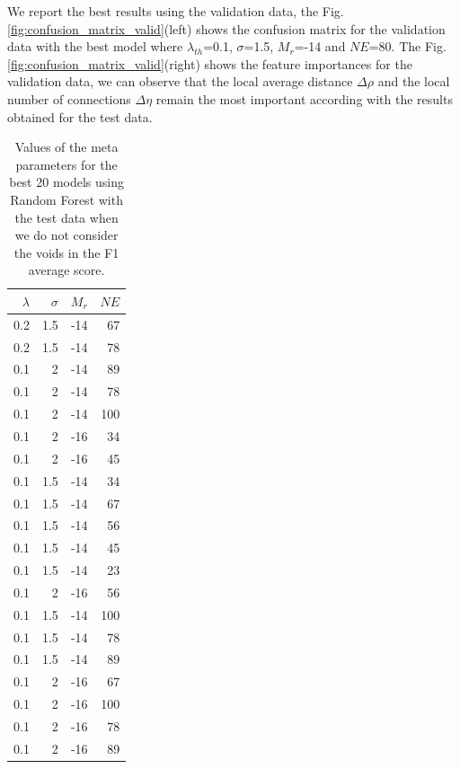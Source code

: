\documentclass[usenatbib]{mnras}
\begin{document}
We report the best results using the validation data, the
Fig. \ref{fig:confusion_matrix_valid}(left) shows the confusion matrix
for the validation data with the best model where $\lambda_{th}$=0.1,
$\sigma$=1.5, $M_r$=-14 and $NE$=80. The
Fig. \ref{fig:confusion_matrix_valid}(right) shows the feature
importances for the validation data, we can observe that the local
average distance $\Delta \rho$ and the local number of connections
$\Delta \eta$ remain the most important according with the results
obtained for the test data. 


\begin{table}
\centering
\begin{tabular}{rrrr}
\hline
   $\lambda$ &   $\sigma$ &   $M_r$ &   $NE$ \\
\hline
         0.2 &        1.5 &     -14 &     67 \\
         0.2 &        1.5 &     -14 &     78 \\
         0.1 &        2   &     -14 &     89 \\
         0.1 &        2   &     -14 &     78 \\
         0.1 &        2   &     -14 &    100 \\
         0.1 &        2   &     -16 &     34 \\
         0.1 &        2   &     -16 &     45 \\
         0.1 &        1.5 &     -14 &     34 \\
         0.1 &        1.5 &     -14 &     67 \\
         0.1 &        1.5 &     -14 &     56 \\
         0.1 &        1.5 &     -14 &     45 \\
         0.1 &        1.5 &     -14 &     23 \\
         0.1 &        2   &     -16 &     56 \\
         0.1 &        1.5 &     -14 &    100 \\
         0.1 &        1.5 &     -14 &     78 \\
         0.1 &        1.5 &     -14 &     89 \\
         0.1 &        2   &     -16 &     67 \\
         0.1 &        2   &     -16 &    100 \\
         0.1 &        2   &     -16 &     78 \\
         0.1 &        2   &     -16 &     89 \\
\hline
\end{tabular}
\caption{Values of the meta parameters for the best 20 models using Random Forest with the test data when we do not consider the voids in the F1 average score.}
\label{tab:metaparameters}
\end{table}
\end{document}
